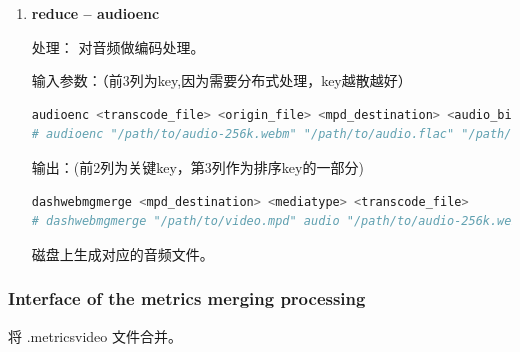 \begin{enumerate}
输入参数：（前3列为key,因为需要分布式处理，key越散越好）
\begin{lstlisting}[language=bash]
metricsv <mmetrics_destination> <transcode_file> <origin_file> <start_frame_number> <screen_resolution>
# metricsv "/path/to/video-320x180-315k.metricsv" "/path/to/tmp/video-320x180-315k-0000000000000000000.mkv" "/path/to/tmp/video-lossless-0000000000000000000.mkv" 0 1280x720
# metricsv "/path/to/video-320x180-315k.metricsv" "/path/to/tmp/video-320x180-315k-0000000000000000001.mkv" "/path/to/tmp/video-lossless-0000000000000000001.mkv" 144 1280x720
\end{lstlisting}


输出：
\begin{lstlisting}[language=bash]
metricsconcat <mmetrics_destination> <mediatype> <mmetrics_file>
# metricsvconcat "/path/to/video-320x180-315k.metricsv" txt "/path/to/tmp/video-320x180-315k-0000000000000000000.1920x1080.metricsv"
# metricsvconcat "/path/to/video-320x180-315k.metricsv" txt "/path/to/tmp/video-320x180-315k-0000000000000000001.1920x1080.metricsv"
\end{lstlisting}

磁盘上生成对应的视频文件、分片.metricsvideo 文件。

该文件是属于分片视频文件的，下一步需要在所有数据收集完后，进行合并。


  \item \textbf{reduce -- audioenc}

处理：
对音频做编码处理。


输入参数：（前3列为key,因为需要分布式处理，key越散越好）
\begin{lstlisting}[language=bash]
audioenc <transcode_file> <origin_file> <mpd_destination> <audio_bitrate>
# audioenc "/path/to/audio-256k.webm" "/path/to/audio.flac" "/path/to/video.gwebm.mpd" 256k
\end{lstlisting}


输出：(前2列为关键key，第3列作为排序key的一部分)
\begin{lstlisting}[language=bash]
dashwebmgmerge <mpd_destination> <mediatype> <transcode_file>
# dashwebmgmerge "/path/to/video.mpd" audio "/path/to/audio-256k.webm"
\end{lstlisting}

磁盘上生成对应的音频文件。

\end{enumerate}



\subsubsection{Interface of the metrics merging processing}
将 .metricsvideo 文件合并。

